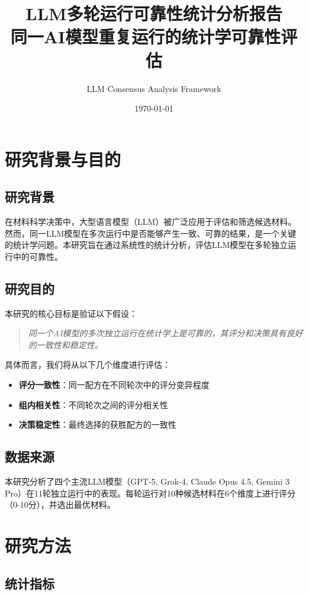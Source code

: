 \documentclass[12pt,a4paper]{article}
\title{\textbf{LLM多轮运行可靠性统计分析报告}\\
\large 同一AI模型重复运行的统计学可靠性评估}
\author{LLM Consensus Analysis Framework}
\date{\today}
\begin{document}
\maketitle

\tableofcontents
\newpage


\section{研究背景与目的}

\subsection{研究背景}
在材料科学决策中，大型语言模型（LLM）被广泛应用于评估和筛选候选材料。然而，同一LLM模型在多次运行中是否能够产生一致、可靠的结果，是一个关键的统计学问题。本研究旨在通过系统性的统计分析，评估LLM模型在多轮独立运行中的可靠性。

\subsection{研究目的}
本研究的核心目标是验证以下假设：
\begin{quote}
\textit{同一个AI模型的多次独立运行在统计学上是可靠的，其评分和决策具有良好的一致性和稳定性。}
\end{quote}

具体而言，我们将从以下几个维度进行评估：
\begin{itemize}
    \item \textbf{评分一致性}：同一配方在不同轮次中的评分变异程度
    \item \textbf{组内相关性}：不同轮次之间的评分相关性
    \item \textbf{决策稳定性}：最终选择的获胜配方的一致性
\end{itemize}

\subsection{数据来源}
本研究分析了四个主流LLM模型（GPT-5, Grok-4, Claude Opus 4.5, Gemini 3 Pro）在11轮独立运行中的表现。每轮运行对10种候选材料在6个维度上进行评分（0-10分），并选出最优材料。

\newpage


\section{研究方法}

\subsection{统计指标}
\end{document}
